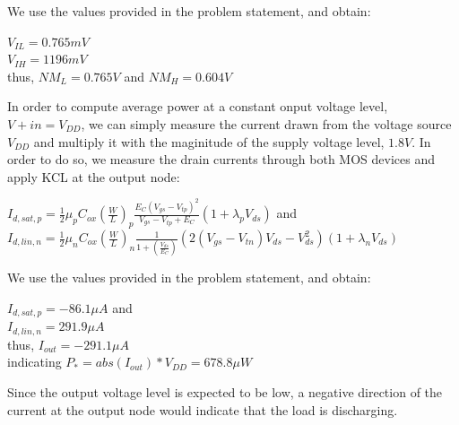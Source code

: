 \documentclass[10pt,a4paper]{article}
\begin{document}
\noindent We use the values provided in the problem statement, and obtain:

\begin{center}
    $V_{IL} = 0.765 mV$ \\
    $V_{IH} = 1196 mV$ \\

    thus, $NM_L = 0.765 V$ and $NM_H = 0.604 V$
\end{center}

\noindent In order to compute average power at a constant onput voltage level, $V+{in} = V_{DD}$, we can simply measure the current drawn from the voltage source $V_{DD}$ and multiply it with the maginitude of the supply voltage level, $1.8V$. In order to do so, we measure the drain currents through both MOS devices and apply KCL at the output node:

\begin{center}
    $I_{d,sat,p} = \frac{1}{2}\mu_{p}C_{ox}(\frac{W}{L})_{p}\frac{E_{C}(V_{gs}-V_{tp})^{2}}{V_{gs}-V_{tp}+E_{C}}(1+\lambda_{p} V_{ds})$ and \\
    $I_{d,lin,n} = \frac{1}{2}\mu_{n}C_{ox}(\frac{W}{L})_{n}\frac{1}{1+(\frac{V_{ds}}{E_{C}})}(2(V_{gs}-V_{tn})V_{ds}-V_{ds}^2)(1+\lambda_{n} V_{ds})$
\end{center}

\noindent We use the values provided in the problem statement, and obtain:

\begin{center}
    $I_{d,sat,p} = -86.1 \mu A$ and \\
    $I_{d,lin,n} = 291.9 \mu A$ \\
    thus, $I_{out} = -291.1 \mu A$ \\
    indicating $P_* = abs(I_{out}) * V_{DD} = 678.8 \mu W$
\end{center}

\noindent Since the output voltage level is expected to be low, a negative direction of the current at the output node would indicate that the load is discharging.
\end{document}
